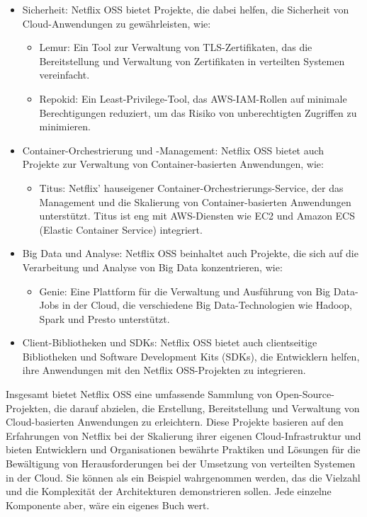 \documentclass[../vs-script-first-v01.tex]{subfiles}
\begin{document}
\begin{itemize}
\begin{itemize}
\end{itemize}
\item Sicherheit: Netflix OSS bietet Projekte, die dabei helfen, die Sicherheit von Cloud-Anwendungen zu gewährleisten, wie:
\begin{itemize}
\item Lemur: Ein Tool zur Verwaltung von TLS-Zertifikaten, das die Bereitstellung und Verwaltung von Zertifikaten in verteilten Systemen vereinfacht.
\item Repokid: Ein Least-Privilege-Tool, das AWS-IAM-Rollen auf minimale Berechtigungen reduziert, um das Risiko von unberechtigten Zugriffen zu minimieren.
\end{itemize}
\item Container-Orchestrierung und -Management: Netflix OSS bietet auch Projekte zur Verwaltung von Container-basierten Anwendungen, wie:
\begin{itemize}
\item Titus: Netflix' hauseigener Container-Orchestrierungs-Service, der das Management und die Skalierung von Container-basierten Anwendungen unterstützt. Titus ist eng mit AWS-Diensten wie EC2 und Amazon ECS (Elastic Container Service) integriert.
\end{itemize}
\item Big Data und Analyse: Netflix OSS beinhaltet auch Projekte, die sich auf die Verarbeitung und Analyse von Big Data konzentrieren, wie:
\begin{itemize}
\item Genie: Eine Plattform für die Verwaltung und Ausführung von Big Data-Jobs in der Cloud, die verschiedene Big Data-Technologien wie Hadoop, Spark und Presto unterstützt.
\end{itemize}
\item Client-Bibliotheken und SDKs: Netflix OSS bietet auch clientseitige Bibliotheken und Software Development Kits (SDKs), die Entwicklern helfen, ihre Anwendungen mit den Netflix OSS-Projekten zu integrieren.
\end{itemize}
Insgesamt bietet Netflix OSS eine umfassende Sammlung von Open-Source-Projekten, die darauf abzielen, die Erstellung, Bereitstellung und Verwaltung von Cloud-basierten Anwendungen zu erleichtern. Diese Projekte basieren auf den Erfahrungen von Netflix bei der Skalierung ihrer eigenen Cloud-Infrastruktur und bieten Entwicklern und Organisationen bewährte Praktiken und Lösungen für die Bewältigung von Herausforderungen bei der Umsetzung von verteilten Systemen in der Cloud. Sie können als ein Beispiel wahrgenommen werden, das die Vielzahl und die Komplexität der Architekturen demonstrieren sollen. Jede einzelne Komponente aber, wäre ein eigenes Buch wert. 
\end{document}
